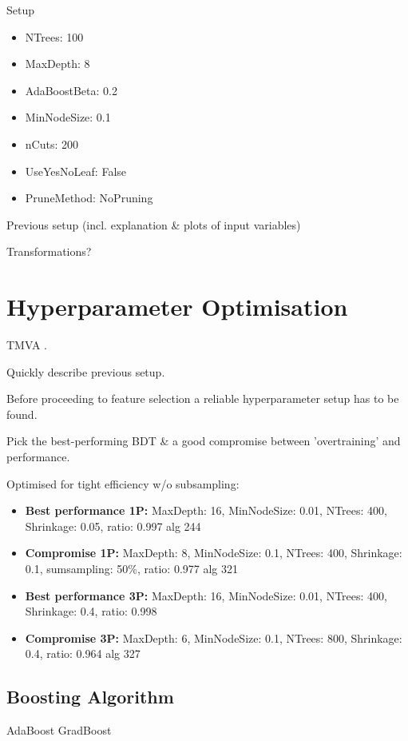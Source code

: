 Setup
\begin{itemize}
\item NTrees: 100
\item MaxDepth: 8
\item AdaBoostBeta: 0.2
\item MinNodeSize: 0.1
\item nCuts: 200
\item UseYesNoLeaf: False
\item PruneMethod: NoPruning
\end{itemize}
Previous setup (incl. explanation \& plots of input variables)

Transformations?

\section{Hyperparameter Optimisation}
\label{sec:bdt_hyperparam}

TMVA \cite{tmva}.

Quickly describe previous setup.

Before proceeding to feature selection a reliable hyperparameter setup has to be
found.

Pick the best-performing BDT \& a good compromise between 'overtraining' and
performance.

Optimised for tight efficiency w/o subsampling:
\begin{itemize}
\item \textbf{Best performance 1P:} MaxDepth: 16, MinNodeSize: 0.01, NTrees:
  400, Shrinkage: 0.05, ratio: 0.997 \textrightarrow alg 244
\item \textbf{Compromise 1P:} MaxDepth: 8, MinNodeSize: 0.1, NTrees: 400,
  Shrinkage: 0.1, sumsampling: 50\%, ratio: 0.977 \textrightarrow alg 321
\item \textbf{Best performance 3P:} MaxDepth: 16, MinNodeSize: 0.01, NTrees:
  400, Shrinkage: 0.4, ratio: 0.998 
\item \textbf{Compromise 3P:} MaxDepth: 6, MinNodeSize: 0.1, NTrees: 800,
  Shrinkage: 0.4, ratio: 0.964 \textrightarrow alg 327
\end{itemize}

\subsection{Boosting Algorithm}
\label{sec:bdt_boosting}

AdaBoost \textrightarrow GradBoost

